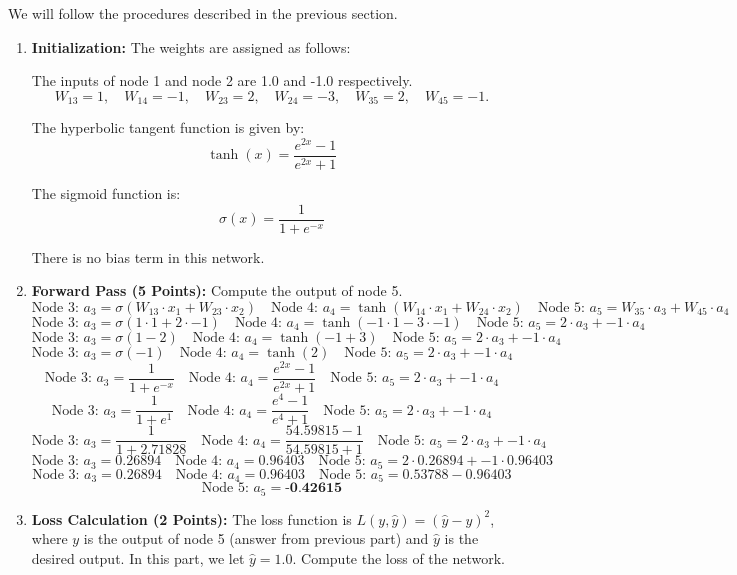 \documentclass{article}
\begin{document}
We will follow the procedures described in the previous section.

\begin{enumerate}
\item \textbf{Initialization: } 
The weights are assigned as follows:


The inputs of node 1 and node 2 are 1.0 and -1.0 respectively.
\[
W_{13} = 1, \quad W_{14} = -1, \quad W_{23} = 2, \quad W_{24} = -3, \quad W_{35} = 2, \quad W_{45} = -1.
\]

The hyperbolic tangent function is given by:
\[
\tanh(x) = \frac{e^{2x} - 1}{e^{2x} + 1}
\]

The sigmoid function is:
\[
\sigma(x) = \frac{1}{1 + e^{-x}}
\]

There is no bias term in this network.


    \item \textbf{Forward Pass (5 Points):} Compute the output of node 5.
    \[
    \text{Node 3: } a_3 = \sigma(W_{13} \cdot x_1 + W_{23} \cdot x_2) \quad \text{Node 4: } a_4 = \tanh(W_{14} \cdot x_1 + W_{24} \cdot x_2) \quad \text{Node 5: } a_5 = W_{35} \cdot a_3 + W_{45} \cdot a_4
    \]
    \[
    \text{Node 3: } a_3 = \sigma(1 \cdot 1 + 2 \cdot -1) \quad \text{Node 4: } a_4 = \tanh(-1 \cdot 1 - 3 \cdot -1) \quad \text{Node 5: } a_5 = 2 \cdot a_3 + -1 \cdot a_4
    \]
    \[
    \text{Node 3: } a_3 = \sigma(1 - 2) \quad \text{Node 4: } a_4 = \tanh(-1 + 3) \quad \text{Node 5: } a_5 = 2 \cdot a_3 + -1 \cdot a_4
    \]
    \[
    \text{Node 3: } a_3 = \sigma(-1) \quad \text{Node 4: } a_4 = \tanh(2) \quad \text{Node 5: } a_5 = 2 \cdot a_3 + -1 \cdot a_4
    \]
    \[
    \text{Node 3: } a_3 = \frac{1}{1 + e^{-x}} \quad \text{Node 4: } a_4 = \frac{e^{2x} - 1}{e^{2x} + 1} \quad \text{Node 5: } a_5 = 2 \cdot a_3 + -1 \cdot a_4
    \]
    \[
    \text{Node 3: } a_3 = \frac{1}{1 + e^{1}} \quad \text{Node 4: } a_4 = \frac{e^{4} - 1}{e^{4} + 1} \quad \text{Node 5: } a_5 = 2 \cdot a_3 + -1 \cdot a_4
    \]
    \[
    \text{Node 3: } a_3 = \frac{1}{1 + 2.71828} \quad \text{Node 4: } a_4 = \frac{54.59815 - 1}{54.59815 + 1} \quad \text{Node 5: } a_5 = 2 \cdot a_3 + -1 \cdot a_4
    \]
    \[
    \text{Node 3: } a_3 = 0.26894 \quad \text{Node 4: } a_4 = 0.96403 \quad \text{Node 5: } a_5 = 2 \cdot 0.26894 + -1 \cdot 0.96403
    \]
    \[
    \text{Node 3: } a_3 = 0.26894 \quad \text{Node 4: } a_4 = 0.96403 \quad \text{Node 5: } a_5 = 0.53788 - 0.96403
    \]
    \[
     \text{Node 5: } a_5 = \textbf{-0.42615}
    \]
    \item \textbf{Loss Calculation (2 Points):} The loss function is $L(y, \hat{y}) = (\hat{y} - y)^2$, where $y$ is the output of node 5 (answer from previous part) and $\hat{y}$ is the desired output. In this part, we let $\hat{y} = 1.0$. Compute the loss of the network.

\end{enumerate}
\end{document}
